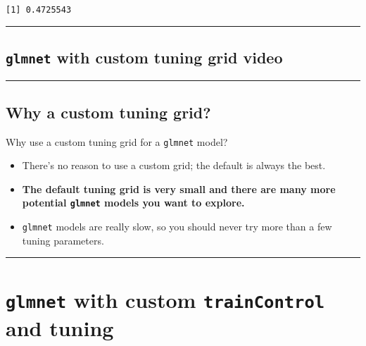 \documentclass[
]{book}
\begin{document}
\begin{verbatim}
[1] 0.4725543
\end{verbatim}

\begin{center}\rule{0.5\linewidth}{0.5pt}\end{center}

\hypertarget{glmnet-with-custom-tuning-grid-video}{%
\subsection*{\texorpdfstring{\texttt{glmnet} with custom tuning grid video}{glmnet with custom tuning grid video}}\label{glmnet-with-custom-tuning-grid-video}}

\begin{center}\rule{0.5\linewidth}{0.5pt}\end{center}

\hypertarget{why-a-custom-tuning-grid}{%
\subsection*{Why a custom tuning grid?}\label{why-a-custom-tuning-grid}}

Why use a custom tuning grid for a \texttt{glmnet} model?

\begin{itemize}
\item
  There's no reason to use a custom grid; the default is always the best.
\item
  \textbf{The default tuning grid is very small and there are many more potential \texttt{glmnet} models you want to explore.}
\item
  \texttt{glmnet} models are really slow, so you should never try more than a few tuning parameters.
\end{itemize}

\begin{center}\rule{0.5\linewidth}{0.5pt}\end{center}

\hypertarget{glmnet-with-custom-traincontrol-and-tuning}{%
\section{\texorpdfstring{\texttt{glmnet} with custom \texttt{trainControl} and tuning}{glmnet with custom trainControl and tuning}}\label{glmnet-with-custom-traincontrol-and-tuning}}
\end{document}
